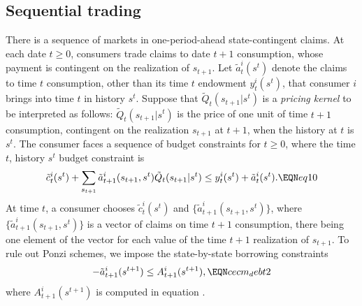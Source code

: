 \subsection{Sequential trading}
There is a sequence of markets in one-period-ahead
state-contingent
 claims.    At each date $t \geq 0$,
consumers trade claims to date $t+1$ consumption, whose payment
is  contingent
on the realization of $s_{t+1}$.   Let $\tilde a_t^i(s^t)$ denote the
claims to time $t$ consumption, other than its time $t$  endowment $y_t^i(s^t)$,
that consumer $i$ brings into time $t$ in history $s^t$. Suppose that
$ \tilde Q_t(s_{t+1} | s^t)$
is a {\it pricing kernel}  to be interpreted as follows:
$\tilde Q_t(s_{t+1} | s^t)$ is the price of one unit of time $t+1$ consumption,
contingent on the realization $s_{t+1}$ at $t+1$, when the
history at $t$ is $s^t$.
The consumer faces a sequence of budget constraints
for $t \geq 0$, where the time $t$, history $s^t$ budget constraint is
$$ \tilde c_t^i(s^t) + \sum_{s_{t+1}} \tilde a^i_{t+1}(s_{t+1},s^t) \tilde Q_t(s_{t+1} | s^t)
     \leq  y_t^i(s^t) + \tilde a_t^i(s^t) . \EQN eq10   $$
At time $t$, a consumer chooses $\tilde c^i_t(s^t)$
and $\{\tilde a^i_{t+1}(s_{t+1},s^t)\}$, where
$\{\tilde a^i_{t+1}(s_{t+1},s^t)\}$  is a vector of claims on time $t+1$ consumption,
there being one element of the vector for each  value of the time $t+1$ realization of
$s_{t+1}$.    To rule out Ponzi schemes,
we impose the state-by-state borrowing
constraints
$$ -  \tilde a^i_{t+1}(s^{t+1}) \leq  A^i_{t+1}(s^{t+1}),        \EQN cecm_debt2$$
where $A^i_{t+1}(s^{t+1})$ is computed in equation .


